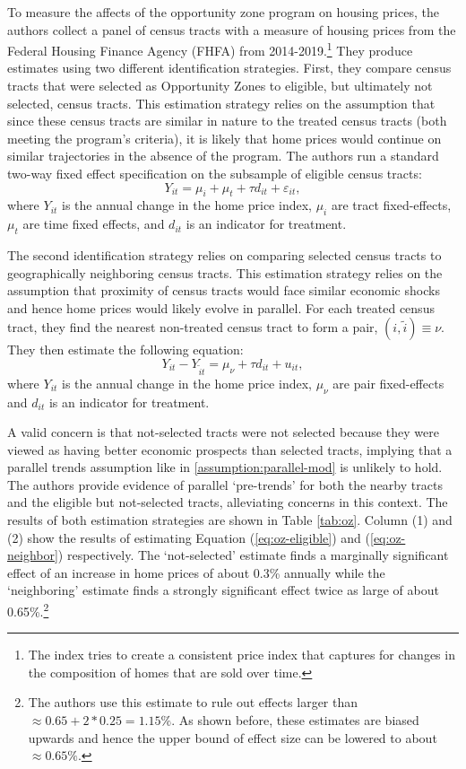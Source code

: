 To measure the affects of the opportunity zone program on housing prices, the authors collect a panel of census tracts with a measure of housing prices from the Federal Housing Finance Agency (FHFA) from 2014-2019.\footnote{The index tries to create a consistent price index that captures for changes in the composition of homes that are sold over time.} They produce estimates using two different identification strategies. First, they compare census tracts that were selected as Opportunity Zones to eligible, but ultimately not selected, census tracts. This estimation strategy relies on the assumption that since these census tracts are similar in nature to the treated census tracts (both meeting the program's criteria), it is likely that home prices would continue on similar trajectories in the absence of the program. The authors run a standard two-way fixed effect specification on the subsample of eligible census tracts:
\begin{equation}\label{eq:oz-eligible}
  Y_{it} = \mu_i + \mu_t + \tau d_{it} + \varepsilon_{it},
\end{equation}
where $Y_{it}$ is the annual change in the home price index, $\mu_i$ are tract fixed-effects, $\mu_t$ are time fixed effects, and $d_{it}$ is an indicator for treatment. 

The second identification strategy relies on comparing selected census tracts to geographically neighboring census tracts. This estimation strategy relies on the assumption that proximity of census tracts would face similar economic shocks and hence home prices would likely evolve in parallel. For each treated census tract, they find the nearest non-treated census tract to form a pair, $(i, \tilde{i}) \equiv \nu$. They then estimate the following equation:
\begin{equation}\label{eq:oz-neighbor}
  Y_{it} - Y_{\tilde{i}t}  = \mu_\nu + \tau d_{it} + u_{it},
\end{equation}
where $Y_{it}$ is the annual change in the home price index, $\mu_\nu$ are pair fixed-effects and $d_{it}$ is an indicator for treatment. 

A valid concern is that not-selected tracts were not selected because they were viewed as having better economic prospects than selected tracts, implying that a parallel trends assumption like in \ref{assumption:parallel-mod} is unlikely to hold. The authors provide evidence of parallel `pre-trends' for both the nearby tracts and the eligible but not-selected tracts, alleviating concerns in this context. The results of both estimation strategies are shown in Table \ref{tab:oz}. Column (1) and (2) show the results of estimating Equation (\ref{eq:oz-eligible}) and (\ref{eq:oz-neighbor}) respectively. The `not-selected' estimate finds a marginally significant effect of an increase in home prices of about 0.3\% annually while the `neighboring' estimate finds a strongly significant effect twice as large of about 0.65\%.\footnote{The authors use this estimate to rule out effects larger than $\approx 0.65 + 2 * 0.25 = 1.15\%$. As shown before, these estimates are biased upwards and hence the upper bound of effect size can be lowered to about $\approx 0.65\%$.} 

